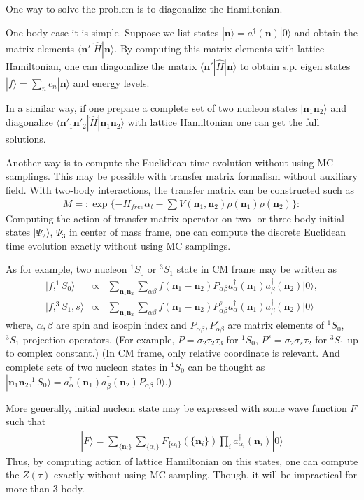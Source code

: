 \documentclass[10pt]{book}
\def\bm{\boldsymbol}
\newcommand{\bea}{\begin{eqnarray}}
\newcommand{\eea}{\end{eqnarray}}
\newcommand{\no}{\nonumber \\}
\def\vn{{\bm n}}
\def\la{\langle}
\def\ra{\rangle}
\begin{document}
One way to solve the problem is to diagonalize the Hamiltonian.

One-body case it is simple. Suppose we list states
$|{\bm n}\ra=a^\dagger(\vn)|0\ra$ and obtain the 
matrix elements $\la \vn'|\hat{H}|\vn\ra$. 
By computing this matrix elements with lattice Hamiltonian, 
one can diagonalize the matrix $\la \vn'|\hat{H}|\vn\ra$
to obtain s.p. eigen states $|f\ra=\sum_{n} c_n |{\vn}\ra$ and energy levels.

In a similar way, if one prepare a complete set of two nucleon states 
$|\vn_1 \vn_2\ra$ and diagonalize $\la \vn'_1 \vn'_2|\hat{H}|\vn_1 \vn_2\ra $ with lattice Hamiltonian
one can get the full solutions. 


Another way is to compute the Euclidiean time evolution without using 
MC samplings. This may be possible with transfer matrix formalism without auxiliary field. 
With two-body interactions, the transfer matrix can be constructed such as
\bea 
M=:\exp\{-H_{free}\alpha_t-\sum V(\vn_1,\vn_2)\rho(\vn_1)\rho(\vn_2) \} :
\eea 
Computing the action of transfer matrix operator on two- or three-body initial states
$|\Psi_2\ra$, $\Psi_3$ in center of mass frame, one can compute the discrete Euclidean time evolution
exactly without using MC samplings.  
 
 As for example, two nucleon $^1S_0$ or $^3S_1$ state in CM frame may be written as
 \bea 
 |f,^{1}S_0\ra &\propto & \sum_{\vn_1\vn_2}\sum_{\alpha\beta}
  f(\vn_1-\vn_2) P_{\alpha\beta} a^\dagger_\alpha(\vn_1)a^\dagger_\beta(\vn_2)|0\ra, \no 
  |f,^{3}S_1,s\ra &\propto& \sum_{\vn_1\vn_2}\sum_{\alpha\beta}
 f(\vn_1-\vn_2) P^s_{\alpha\beta} a^\dagger_\alpha(\vn_1)a^\dagger_\beta(\vn_2)|0\ra  
 \eea 
 where, $\alpha,\beta$ are spin and isospin index 
 and $P_{\alpha\beta},P^s_{\alpha\beta}$ are matrix elements of $^1S_0$, $^3S_1$ projection 
 operators. (For example, $P=\sigma_2 \tau_2\tau_3$ for $^1S_0$, $P^s=\sigma_2\sigma_s \tau_2$
 for $^3S_1$ up to complex constant.)
 (In CM frame, only relative coordinate is relevant.
 And complete sets of two nucleon states in $^1S_0$ can be thought as 
 $|\vn_1\vn_2,^1S_0\ra=a^\dagger_\alpha(\vn_1) a^\dagger_\beta(\vn_2) P_{\alpha\beta}|0\ra$.) 
 
More generally, initial nucleon state may be expressed with some wave function $F$ such that 
\bea 
|F\ra = \sum_{\{\vn_i\}} \sum_{\{\alpha_i\} } F_{\{\alpha_i\}}(\{\vn_i\}) 
        \prod_i a^\dagger_{\alpha_i}(\vn_i) |0\ra 
\eea 
Thus, by computing action of lattice Hamiltonian on this states, one can compute the
$Z(\tau)$ exactly without using MC sampling. Though, it will be impractical for more than 3-body. 
\end{document}
